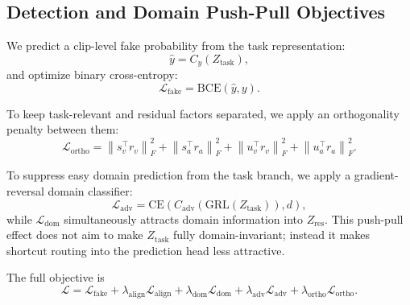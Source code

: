 \documentclass{article}
\begin{document}
\subsection{Detection and Domain Push-Pull Objectives}

We predict a clip-level fake probability from the task representation:
\begin{equation}
\hat{y} = C_y(Z_{\mathrm{task}}),
\end{equation}
and optimize binary cross-entropy:
\begin{equation}
\mathcal{L}_{\mathrm{fake}} = \mathrm{BCE}(\hat{y}, y).
\end{equation}

To keep task-relevant and residual factors separated, we apply an orthogonality penalty between them:
\begin{equation}
\mathcal{L}_{\mathrm{ortho}} =
\left\| s_v^\top r_v \right\|_F^2
+ \left\| s_a^\top r_a \right\|_F^2
+ \left\| u_v^\top r_v \right\|_F^2
+ \left\| u_a^\top r_a \right\|_F^2.
\end{equation}

To suppress easy domain prediction from the task branch, we apply a gradient-reversal domain classifier:
\begin{equation}
\mathcal{L}_{\mathrm{adv}} =
\mathrm{CE}(C_{\mathrm{adv}}(\mathrm{GRL}(Z_{\mathrm{task}})), d),
\end{equation}
while $\mathcal{L}_{\mathrm{dom}}$ simultaneously attracts domain information into $Z_{\mathrm{res}}$. This push-pull effect does not aim to make $Z_{\mathrm{task}}$ fully domain-invariant; instead it makes shortcut routing into the prediction head less attractive.

The full objective is
\begin{equation}
\mathcal{L}
=
\mathcal{L}_{\mathrm{fake}}
+
\lambda_{\mathrm{align}} \mathcal{L}_{\mathrm{align}}
+
\lambda_{\mathrm{dom}} \mathcal{L}_{\mathrm{dom}}
+
\lambda_{\mathrm{adv}} \mathcal{L}_{\mathrm{adv}}
+
\lambda_{\mathrm{ortho}} \mathcal{L}_{\mathrm{ortho}}.
\label{eq:full_objective}
\end{equation}
\end{document}
